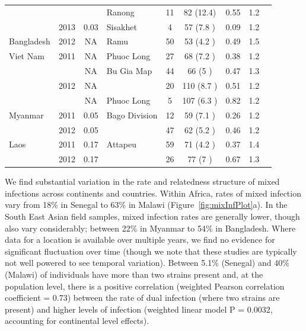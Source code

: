 \documentclass[9pt,lineno]{elife}
\begin{document}
\begin{table}[btp]
{\begin{tabular}{p{1.4cm} c c |p{1.7cm} c c c c p{2.7cm}}
                &               &      &Ranong&11   &82   (12.4)&0.55 &1.2  &\\
                &2013           &0.03  &Sisakhet&4    &57   (7.8 )&0.09 &1.2  &\\
\cline{1-8}
Bangladesh      &2012           &NA    &Ramu &50   &53   (4.2 )&0.49 &1.5  &\\
\cline{1-8}
Viet Nam        &2011           &NA    &Phuoc Long&27   &68   (7.2 )&0.38 &1.2  &\\
                &               &NA    &Bu Gia Map&44   &66   (5   )&0.47 &1.3  &\\
                &2012           &NA    &               &20   &110  (8.7 )&0.51 &1.2  &\\
                &               &NA    &Phuoc Long&5    &107  (6.3 )&0.82 &1.2  &\\
\cline{1-8}
Myanmar         &2011           &0.05  &Bago Division &12   &59   (7.1 )&0.26 &1.2  &\\
                &2012           &0.05  &               &47   &62   (5.2 )&0.46 &1.2  &\\
\cline{1-8}
Laos            &2011           &0.17  &Attapeu&59   &71   (4.2 )&0.37 &1.4  &\\
                &2012           &0.17  &               &26   &77   (7   )&0.67 &1.3  &\\
\hline
\bottomrule
\end{tabular}
}

\end{table}


We find substantial variation in the rate and relatedness structure of mixed infections across continents and countries.  Within Africa, rates of mixed infection vary from 18\% in Senegal to 63\% in Malawi (Figure~\ref{fig:mixInfPlot}a).  In the South East Asian field samples, mixed infection rates are generally lower, though also vary considerably; between 22\% in Myanmar to 54\% in Bangladesh.  Where data for a location is available over multiple years, we find no evidence for significant fluctuation over time (though we note that these studies are typically not well powered to see temporal variation).  Between 5.1\% (Senegal) and 40\% (Malawi) of individuals have more than two strains present and, at the population level, there is a positive correlation (weighted Pearson correlation coefficient = 0.73) between the rate of dual infection (where two strains are present) and higher levels of infection (weighted linear model P = 0.0032, accounting for continental level effects).
\end{document}

